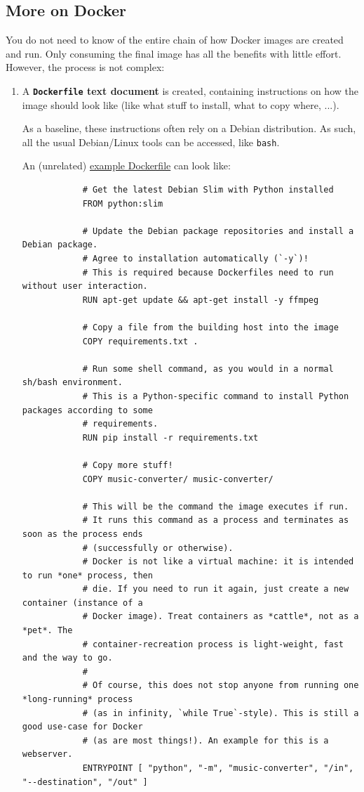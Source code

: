 \subsection{More on Docker}

You do not need to know of the entire chain of how Docker images are created and run.
Only consuming the final image has all the benefits with little effort.
However, the process is not complex:
\begin{enumerate}
  \item A \textbf{\texttt{Dockerfile} text document} is created, containing instructions on how the image should look like (like what stuff to install, what to copy where, ...).

        As a baseline, these instructions often rely on a Debian distribution.
        As such, all the usual Debian/Linux tools can be accessed, like \texttt{bash}.

        An (unrelated)
        \href{https://github.com/alexpovel/random_python/blob/master/music-converter/Dockerfile}{example Dockerfile}
        can look like:

        \begin{verbatim}
            # Get the latest Debian Slim with Python installed
            FROM python:slim

            # Update the Debian package repositories and install a Debian package.
            # Agree to installation automatically (`-y`)!
            # This is required because Dockerfiles need to run without user interaction.
            RUN apt-get update && apt-get install -y ffmpeg

            # Copy a file from the building host into the image
            COPY requirements.txt .

            # Run some shell command, as you would in a normal sh/bash environment.
            # This is a Python-specific command to install Python packages according to some
            # requirements.
            RUN pip install -r requirements.txt

            # Copy more stuff!
            COPY music-converter/ music-converter/

            # This will be the command the image executes if run.
            # It runs this command as a process and terminates as soon as the process ends
            # (successfully or otherwise).
            # Docker is not like a virtual machine: it is intended to run *one* process, then
            # die. If you need to run it again, just create a new container (instance of a
            # Docker image). Treat containers as *cattle*, not as a *pet*. The
            # container-recreation process is light-weight, fast and the way to go.
            #
            # Of course, this does not stop anyone from running one *long-running* process
            # (as in infinity, `while True`-style). This is still a good use-case for Docker
            # (as are most things!). An example for this is a webserver.
            ENTRYPOINT [ "python", "-m", "music-converter", "/in", "--destination", "/out" ]
        \end{verbatim}


\end{enumerate}
